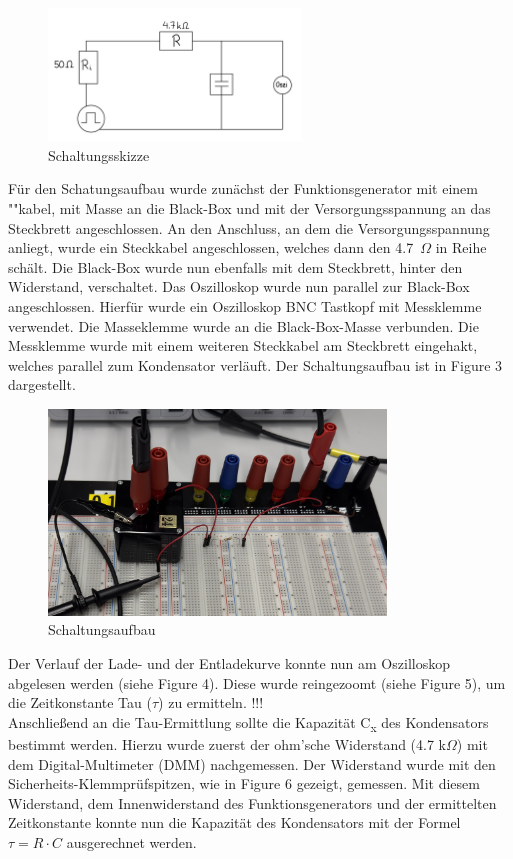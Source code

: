 \documentclass[a4paper,12pt]{article}
\begin{document}
\begin{figure}[H]
    \centering
    \includegraphics[width=0.6\textwidth]{../Quellen/Labor2/SchaltungsaufbauVersuch1.jpeg}
\caption{Schaltungsskizze}
\end{figure}

\noindent Für den Schatungsaufbau wurde zunächst der Funktionsgenerator mit einem ""kabel, mit Masse an die Black-Box und mit der Versorgungsspannung an das Steckbrett angeschlossen. An den Anschluss, an dem die Versorgungsspannung anliegt, wurde ein Steckkabel angeschlossen, welches dann den 4.7~$\Omega$ in Reihe schält. Die Black-Box wurde nun ebenfalls mit dem Steckbrett, hinter den Widerstand, verschaltet. Das Oszilloskop wurde nun parallel zur Black-Box angeschlossen. Hierfür wurde ein Oszilloskop BNC Tastkopf mit Messklemme verwendet. Die Masseklemme wurde an die Black-Box-Masse verbunden. Die Messklemme wurde mit einem weiteren Steckkabel am Steckbrett eingehakt, welches parallel zum Kondensator verläuft. Der Schaltungsaufbau ist in Figure 3 dargestellt.

\begin{figure}[H]
    \centering
    \includegraphics[width=0.8\textwidth]{../Quellen/Labor2/IMG_3965 - Kopie.jpeg}
\caption{Schaltungsaufbau}
\end{figure}

\noindent Der Verlauf der Lade- und der Entladekurve konnte nun am Oszilloskop abgelesen werden (siehe Figure 4). Diese wurde reingezoomt (siehe Figure 5), um die Zeitkonstante Tau ($\tau$) zu ermitteln. !!! \\
Anschließend an die Tau-Ermittlung sollte die Kapazität C\textsubscript{x} des Kondensators bestimmt werden. Hierzu wurde zuerst der ohm'sche Widerstand (4.7 k$\Omega$) mit dem Digital-Multimeter (DMM) nachgemessen. Der Widerstand wurde mit den Sicherheits-Klemmprüfspitzen, wie in Figure 6 gezeigt, gemessen. Mit diesem Widerstand, dem Innenwiderstand des Funktionsgenerators und der ermittelten Zeitkonstante konnte nun die Kapazität des Kondensators mit der Formel $\tau = R \cdot C$ ausgerechnet werden.
\end{document}
